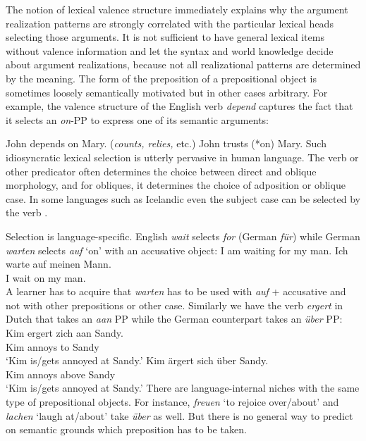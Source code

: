 \begin{exe}
\begin{xlist}[iv.]
\begin{exe}
\begin{xlist}[iv.]
The notion of lexical valence structure immediately explains why the argument realization patterns
are strongly correlated with the particular lexical heads selecting those arguments.  
It is not sufficient to have general lexical items without valence information
and let the syntax and world knowledge decide about argument realizations, 
because not all 
realizational patterns are determined by the meaning. 
The form of the preposition of a prepositional object is sometimes loosely semantically motivated but in
other cases arbitrary.  For example, the valence structure of the English verb \emph{depend} captures the fact that it selects an \emph{on}-PP to express one of its semantic arguments: 

\eal\label{depends-on-ex}
\ex John depends on Mary.  (\emph{counts, relies,} etc.)
\ex John trusts (*on) Mary.  
\ex 
{}
\zl
Such idiosyncratic lexical selection is utterly pervasive in human language.  The verb or other
predicator often determines the choice between direct and oblique morphology, and for obliques, it
determines the choice of adposition or oblique case.  In some languages such as Icelandic even the
subject case can be selected by the verb \citep*{ZMT85a}.

Selection is language-specific.  English \emph{wait} selects \emph{for} (German \emph{für}) while German \emph{warten} selects \emph{auf} `on' with an accusative object:
\eal\label{loureed}
\ex I am waiting for my man.
\ex 
\gll Ich warte auf meinen Mann.\\
     I   wait  on  my     man.\acc\\
\zl
A learner has to acquire that \emph{warten} has to be used with \emph{auf} + accusative and not with other prepositions or other
case. 
Similarly we have the verb \emph{ergert} in Dutch that takes an \emph{aan} PP while the
German counterpart takes an \emph{über} PP:
\eal
\label{ex-ergert-aan-aergert-ueber}
\ex 
\gll Kim ergert zich aan Sandy.\\
     Kim annoys \REFL{} to Sandy\\
\glt `Kim is/gets annoyed at Sandy.'
\ex 
\gll Kim ärgert sich über Sandy.\\
     Kim annoys \REFL{} above Sandy\\
\glt `Kim is/gets annoyed at Sandy.'
\zl
There are language-internal niches with the same type of prepositional objects. For instance,
\emph{freuen} `to rejoice over/about' and \emph{lachen} `laugh at/about' take \emph{über} as
well. But there is no general way to predict on semantic grounds which preposition has to be taken.


\end{xlist}
\end{exe}
\end{xlist}
\end{exe}
